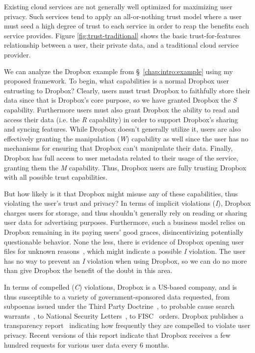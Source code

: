 Existing cloud services are not generally well optimized for
maximizing user privacy. Such services tend to apply an all-or-nothing
trust model where a user must seed a high degree of trust to each
service in order to reap the benefits each service provides. Figure
\ref{fig:trust-traditional} shows the basic trust-for-features
relationship between a user, their private data, and a traditional
cloud service provider.

We can analyze the Dropbox example from \S~\ref{chap:intro:example}
using my proposed framework. To begin, what capabilities is a normal
Dropbox user entrusting to Dropbox? Clearly, users must trust Dropbox
to faithfully store their data since that is Dropbox's core purpose,
so we have granted Dropbox the \emph{S} capability. Furthermore users
must also grant Dropbox the ability to read and access their data
(i.e. the \emph{R} capability) in order to support Dropbox's sharing
and syncing features. While Dropbox doesn't generally utilize it,
users are also effectively granting the manipulation (\emph{W})
capability as well since the user has no mechanisms for ensuring that
Dropbox can't manipulate their data. Finally, Dropbox has full access
to user metadata related to their usage of the service, granting them
the \emph{M} capability. Thus, Dropbox users are fully trusting
Dropbox with all possible trust capabilities.

But how likely is it that Dropbox might misuse any of these
capabilities, thus violating the user's trust and privacy? In terms of
implicit violations (\emph{I}), Dropbox charges users for storage, and
thus shouldn't generally rely on reading or sharing user data for
advertising purposes. Furthermore, such a business model relies on
Dropbox remaining in its paying users' good graces, disincentivizing
potentially questionable behavior. None the less, there is evidence of
Dropbox opening user files for unknown
reasons~\cite{vintsurf-dropbox}, which might indicate a possible
\emph{I} violation. The user has no way to prevent an \emph{I}
violation when using Dropbox, so we can do no more than give Dropbox
the benefit of the doubt in this area.

In terms of compelled (\emph{C}) violations, Dropbox is a US-based
company, and is thus susceptible to a variety of government-sponsored
data requested, from subpoenas issued under the Third Party
Doctrine~\cite{thompson-thirdparty}, to probable cause search
warrants~\cite{us-constitution-amend4}, to National Security
Letters~\cite{fbi-nsl}, to FISC~\cite{fisc} orders. Dropbox publishes
a transparency report~\cite{dropbox-transparency} indicating how
frequently they are compelled to violate user privacy. Recent versions
of this report indicate that Dropbox receives a few hundred requests
for various user data every 6 months.

